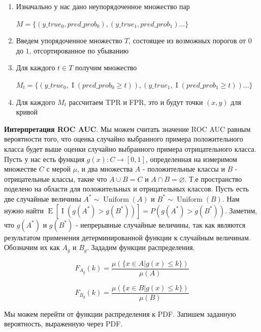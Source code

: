 \documentclass{article}
\begin{document}
    \begin{enumerate}
        \item Изначально у нас дано неупорядоченное множество пар 
        
        $M = \{(y\_true_{0}, pred\_prob_{0}), (y\_true_{1}, pred\_prob_{1}) ... \}$

        \item Введем упорядоченное множество $T$, состоящее из возможных порогов от $0$ до $1$, отсортированное по убыванию  
        \item Для каждого $t \in T$ получим множество 
        
        $M_{t} = \{(y\_true_{0}, \operatorname{I}(pred\_prob_{0} \geq t)), (y\_true_{1}, \operatorname{I}(pred\_prob_{1} \geq t)) ... \}$
        \item Для каждого $M_t$ рассчитаем TPR и FPR, это и будут точки $(x, y)$ для кривой 
    \end{enumerate}

    \textbf{Интерпретация ROC AUC}. Мы можем считать значение ROC AUC равным вероятности того, что оценка случайно выбранного примера положительного класса
    будет выше оценки случайно выбранного примера отрицательного класса.  Пусть у нас есть функция $g(x): C \rightarrow [0, 1]$, определенная
    на измеримом множестве $C$ с мерой $\mu$, и два множества $A$ - положительные классы и $B$ - отрицательные классы, 
    такие что $A \cup B = C$ и $A \cap B = \varnothing$. 
    Т.е пространство поделено на области для положительных и отрицательных классов.
    Пусть есть две случайные величины $A^* \sim \operatorname{Uniform}(A)$ и $B^* \sim \operatorname{Uniform}(B)$. Нам нужно найти 
    $\operatorname{E}[\operatorname{I}(g(A^*) > g(B^*))] = P(g(A^*) > g(B^*))$. Заметим, что $g(A^*)$ и $g(B^*)$ - непрерывные случайные величины, так как являются
    результатом применения детерминированной функции к случайным величинам. Обозначим их как $A_{g}$ и $B_{g}$. Зададим функции распределения.

    \begin{equation}
        F_{A_{g}}(k) = \frac{\mu(\{x \in A | g(x) \leq k\})}{\mu(A)}
    \end{equation}

    \begin{equation}
        F_{B_{g}}(k) = \frac{\mu(\{x \in B | g(x) \leq k\})}{\mu(B)}
    \end{equation}

    Мы можем перейти от функции распределения к PDF. Запишем заданную вероятность, выраженную через PDF.
\end{document}
